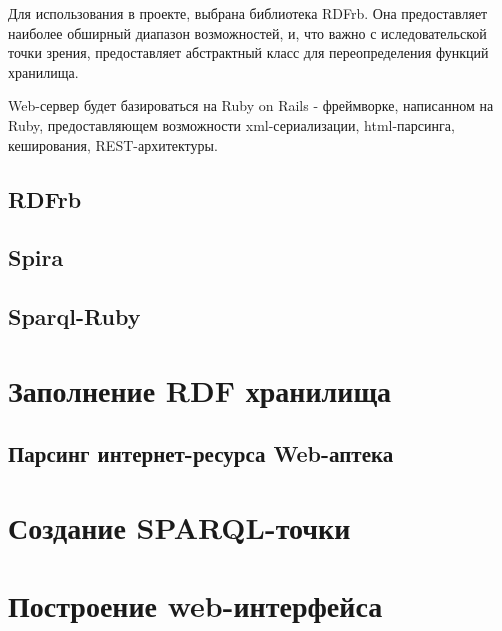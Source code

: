 \documentclass[specialist,subf,href,colorlinks=true
]{disser}
\begin{document}
Для использования в проекте, выбрана библиотека RDFrb. Она предоставляет наиболее обширный диапазон возможностей, и, что важно с иследовательской точки зрения, предоставляет абстрактный класс для переопределения функций хранилища.

Web-сервер будет базироваться на Ruby on Rails - фреймворке, написанном на Ruby, предоставляющем возможности xml-сериализации, html-парсинга, кеширования, REST-архитектуры.
\section{RDFrb}
\section{Spira}
\section{Sparql-Ruby}

\chapter{Заполнение RDF хранилища}
\section{Парсинг интернет-ресурса Web-аптека}
\chapter{Создание SPARQL-точки}
\chapter{Построение web-интерфейса}
\end{document}
